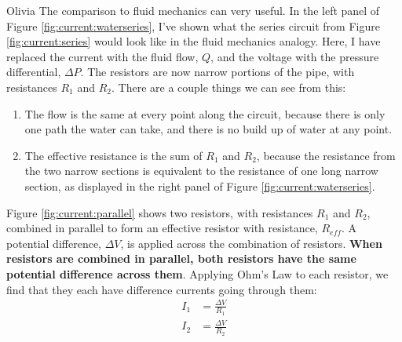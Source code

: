 \begin{studentOpinion}{Olivia}
The comparison to fluid mechanics can very useful. In the left panel of Figure \ref{fig:current:waterseries}, I've shown what the series circuit from Figure \ref{fig:current:series} would look like in the fluid mechanics analogy. Here, I have replaced the current with the fluid flow, $Q$, and the voltage with the pressure differential, $\Delta P$. The resistors are now narrow portions of the pipe, with resistances $R_1$ and $R_2$. There are a couple things we can see from this:
\begin{enumerate}
\item The flow is the same at every point along the circuit, because there is only one path the water can take, and there is no build up of water at any point.
\item The effective resistance is the sum of $R_1$ and $R_2$, because the resistance from the two narrow sections is equivalent to the resistance of one long narrow section, as displayed in the right panel of Figure \ref{fig:current:waterseries}.
\end{enumerate}
\end{studentOpinion}


Figure \ref{fig:current:parallel} shows two resistors, with resistances $R_1$ and $R_2$, combined in parallel to form an effective resistor with resistance, $R_{eff}$. A potential difference, $\Delta V$, is applied across the combination of resistors. \textbf{When resistors are combined in parallel, both resistors have the same potential difference across them}.
Applying Ohm's Law to each resistor, we find that they each have difference currents going through them:
\begin{align*}
I_1&=\frac{\Delta V}{R_1}\\
I_2&=\frac{\Delta V}{R_2}
\end{align*}

